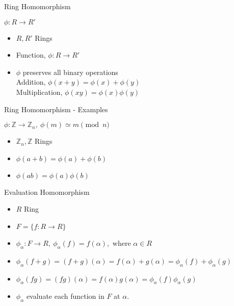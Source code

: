 \documentclass{beamer}
\begin{document}
\begin{frame}{Ring Homomorphism}
\begin{block}{$ \phi : R \to R' $}
\begin{itemize}
	\item $R,R'$ Rings
	\item Function, $ \phi : R \to R' $
	\item $\phi$ preserves all binary operations\\
	Addition, $\phi(x+y) = \phi(x)+\phi(y)$\\
	Multiplication, $\phi(xy) = \phi(x)\phi(y)$
\end{itemize}
\end{block}
\end{frame}

\begin{frame}{Ring Homomorphism - Examples}
\begin{exampleblock}{$\phi : \mathbb{Z} \to \mathbb{Z}_n,\ \phi(m) \simeq m \pmod{n}$}
\begin{itemize}
	\item $\mathbb{Z}_n, \mathbb{Z}$ Rings
	\item $\phi(a+b) = \phi(a)+\phi(b)$
	\item $\phi(ab) = \phi(a)\phi(b)$
\end{itemize}
\end{exampleblock}
\begin{exampleblock}{Evaluation Homomorphism}
\begin{itemize}
	\item $R$ Ring
	\item $F = \{ f : R \to R \}$
	\item $\phi_{\alpha} : F \to R,\ \phi_{\alpha}(f) = f(\alpha), \text{ where } \alpha \in R$
	\item $\phi_{\alpha}(f + g) = (f+g)(\alpha) = f(\alpha) + g(\alpha) = \phi_{\alpha}(f) + \phi_{\alpha}(g)$
	\item $\phi_{\alpha}(fg) = (fg)(\alpha) = f(\alpha) g(\alpha) = \phi_{\alpha}(f) \phi_{\alpha}(g)$
	\item $\phi_{\alpha}$ evaluate each function in $F$ at $\alpha$.
\end{itemize}
\end{exampleblock}
\end{frame}
\end{document}
